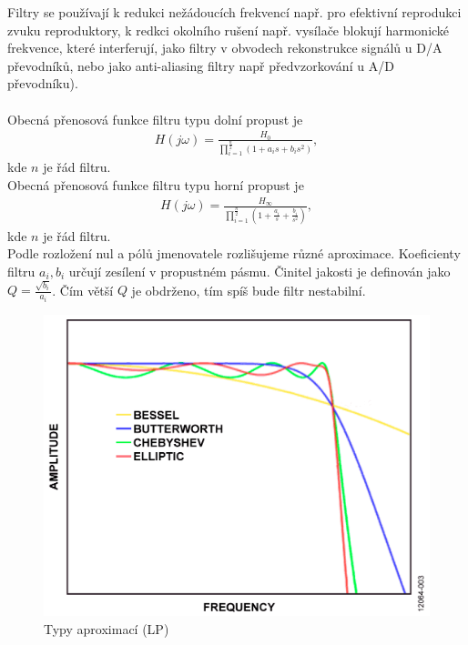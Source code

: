 \documentclass[twoside]{article}
\begin{document}
\noindent Filtry se používají k redukci nežádoucích frekvencí např. pro efektivní reprodukci zvuku reproduktory, k redkci okolního rušení např. vysílače blokují harmonické frekvence, které interferují, jako filtry v obvodech rekonstrukce signálů u D/A převodníků, nebo jako anti-aliasing filtry např předvzorkování u A/D převodníku).\\\\
Obecná přenosová funkce filtru typu dolní propust je
\begin{align}
H(j\omega) = \frac{H_0}{\prod_{i=1}^{\frac{n}{2}} (1 + a_i s + b_i s^2)},
\end{align}
kde $n$ je řád filtru.\\
Obecná přenosová funkce filtru typu horní propust je
\begin{align}
H(j\omega) = \frac{H_{\infty}}{\prod_{i=1}^{\frac{n}{2}} (1 + \frac{a_i}{s} + \frac{b_i}{s^2})},
\end{align}
kde $n$ je řád filtru.\\
Podle rozložení nul a pólů jmenovatele rozlišujeme různé aproximace. Koeficienty filtru $a_i, b_i$ určují zesílení v propustném pásmu. Činitel jakosti je definován jako $Q = \frac{\sqrt{b_i}}{a_i}$. Čím větší $Q$ je obdrženo, tím spíš bude filtr nestabilní.
\begin{figure}[H]
\centering
\includegraphics[scale=0.3]{LGA98.png}
\caption{Typy aproximací (LP)\cite{2}}
\end{figure}
\end{document}
